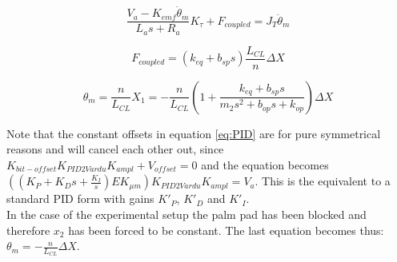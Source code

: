\begin{equation}
	\frac{V_a - K_{emf}\dot{\theta}_m}{L_a s + R_a} K_{\tau} + F_{coupled} = J_T \ddot{\theta}_m
	\label{eq:motor_torques}
\end{equation}
	
\begin{equation}
	F_{coupled} = (k_{eq} + b_{sp}s) \frac{L_{CL}}{n} \Delta X
	\label{eq:fcoupled}
\end{equation}
	
\begin{equation}
	\theta_m = \frac{n}{L_{CL}} X_1 = -\frac{n}{L_{CL}}(1 + \frac{k_{eq} + b_{sp}s}{m_2 s^2 + b_{op}s + k_{op}}) \Delta X
    \label{eq:theta}
\end{equation}
	
Note that the constant offsets in equation \ref{eq:PID} are for pure symmetrical reasons and will cancel each other out, since $K_{bit-offset} K_{PID2Vardu} K_{ampl} + V_{offset} = 0$ and the equation becomes $ ((K_P + K_D s + \frac{K_I}{s})E K_{\mu m} ) K_{PID2Vardu} K_{ampl}= V_a$. This is the equivalent to a standard PID form with gains $K'_P$, $K'_D$ and $K'_I$.\\
In the case of the experimental setup the palm pad has been blocked and therefore $x_2$ has been forced to be constant. The last equation becomes thus: $\theta_m = - \frac{n}{L_{CL}} \Delta X$.


\newpage